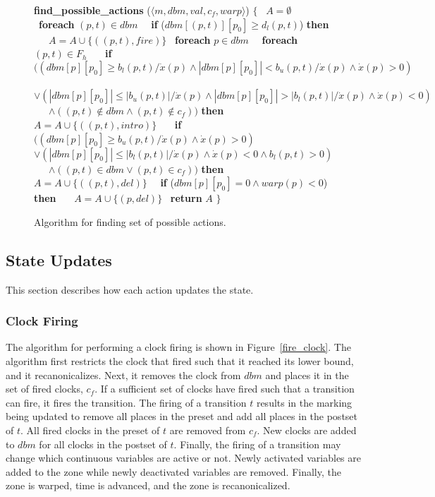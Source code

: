 \documentclass[11pt,times]{article}
\begin{document}
\begin{figure}[htbp]
\begin{algorithm}
\small 
{\bf{find\_possible\_actions}} ($\langle m,dbm,val,c_f,warp \rangle$) $\{$
\ $A = \emptyset$
\ {\bf{foreach}} $(p,t) \in dbm$
\ \ {\bf{if}} ($dbm[(p, t)][p_0] \geq d_l(p, t)$) {\bf{then}}
\ \ \ $A = A \cup \{((p,t),fire)\}$
\ {\bf{foreach}} $p \in dbm$
\ \ {\bf{foreach}} $(p,t) \in F_h$
\ \ \ {\bf{if}} $((dbm[p][p_0] \ge b_l(p,t) / \dot{x}(p) \wedge \left| dbm[p][p_0] \right| < b_u(p,t) / \dot{x}(p) \wedge \dot{x}(p) > 0)$
\ \ \ $\vee (\left| dbm[p][p_0] \right| \le \left| b_u(p,t) \right| / \dot{x}(p) \wedge \left| dbm[p][p_0] \right| > \left| b_l(p,t) \right| / \dot{x}(p) \wedge \dot{x}(p) < 0)$
\ \ \ $\wedge ((p,t) \not\in dbm \wedge (p,t) \not\in c_{f}))$ {\bf{then}}
\ \ \ \ $A = A \cup \{((p,t),intro)\}$
\ \ \ {\bf{if}} $((dbm[p][p_0] \ge b_u(p,t) / \dot{x}(p) \wedge \dot{x}(p) > 0)$
\ \ \ $\vee (\left| dbm[p][p_0] \right| \le \left| b_l(p,t) \right| / \dot{x}(p) \wedge \dot{x}(p) < 0  \wedge b_l(p,t) > 0 )$
\ \ \ $\wedge ((p,t) \in dbm \vee (p,t) \in c_{f}))$ {\bf{then}}
\ \ \ \ $A = A \cup \{((p,t),del)\}$
\ \ {\bf{if}} ($dbm[p][p_0] = 0 \wedge warp(p) < 0$) {\bf{then}}
\ \ \ $A = A \cup \{(p,del)\}$
\ {\bf{return}} $A$
$\}$    
\end{algorithm}
\caption{\label{possible}Algorithm for finding set of possible actions.}
\end{figure}
  
\subsection{State Updates}

This section describes how each action updates the state.

\subsubsection{Clock Firing}

The algorithm for performing a
clock firing is shown in Figure~\ref{fire_clock}.  The algorithm first
restricts the clock that fired such that it reached its lower bound,
and it recanonicalizes.  Next, it removes the clock from $dbm$ and places
it in the set of fired clocks, $c_f$.  If a sufficient set of clocks have 
fired such that a transition can fire, it fires the transition.  The 
firing of a transition $t$ results in the marking being updated to remove
all places in the preset and add all places in the postset of $t$.  
All fired clocks in the preset of $t$ are removed from $c_f$.
New clocks are added to $dbm$ for all clocks in the postset of $t$.
Finally, the firing of a transition may change which continuous variables
are active or not.  Newly activated variables are added to the zone while
newly deactivated variables are removed.  Finally, the zone is warped,
time is advanced, and the zone is recanonicalized.
\end{document}
